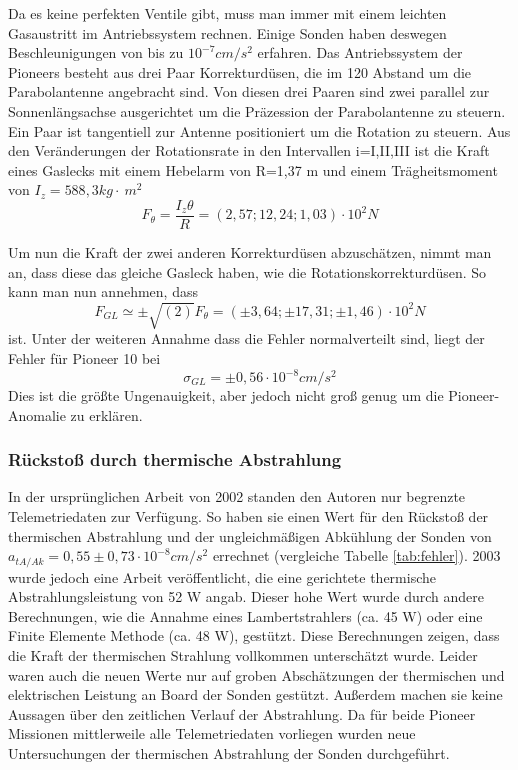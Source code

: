Da es keine perfekten Ventile gibt, muss man immer mit einem leichten
Gasaustritt im Antriebssystem rechnen. Einige Sonden\cite{Anderson2002} haben
deswegen Beschleunigungen von bis zu $10^{-7}\mathit{cm}/s^{2}$
erfahren. Das Antriebssystem der Pioneers besteht aus drei Paar
Korrekturd\"usen, die im 120{\textdegree} Abstand um die Parabolantenne
angebracht sind. Von diesen drei Paaren sind zwei parallel zur
Sonnenl\"angsachse ausgerichtet um die Pr\"azession der Parabolantenne
zu steuern. Ein Paar ist tangentiell zur Antenne positioniert um die
Rotation zu steuern. Aus den Ver\"anderungen der Rotationsrate in den
Intervallen i=I,II,III ist die Kraft eines Gaslecks mit einem Hebelarm
von R=1,37 m und einem Tr\"agheitsmoment von
$I_{z}=588,3\mathit{kg}\cdot\ m^{2}$
\begin{equation}
F_{\theta }=\frac{I_{z}\theta }{R}=(2,57;12,24;1,03)\cdot
10^{2}N
\end{equation}

Um nun die Kraft der zwei anderen Korrekturd\"usen abzusch\"atzen, nimmt
man an, dass diese das gleiche Gasleck haben, wie die
Rotationskorrekturd\"usen. So kann man nun annehmen\cite{Anderson2002}, dass
\begin{equation}
F_{\mathit{GL}}\simeq \pm \sqrt{(2)}F_{\theta }=(\pm 3,64;\pm
17,31;\pm 1,46)\cdot 10^{2}N
\end{equation}
ist. Unter der weiteren Annahme dass die Fehler normalverteilt sind,
liegt der Fehler f\"ur Pioneer 10 bei
\begin{equation}
\sigma _{\mathit{GL}}=\pm 0,56\cdot 10^{-8}\mathit{cm}/s^{2}
\end{equation}
Dies ist die gr\"o{\ss}te Ungenauigkeit, aber jedoch nicht gro{\ss}
genug um die Pioneer-Anomalie zu erkl\"aren.


\bigskip

\subsubsection{R\"ucksto{\ss} durch thermische Abstrahlung}\label{Hitze}

In der urspr\"unglichen Arbeit von 2002 \cite{Anderson2002} standen den Autoren nur
begrenzte Telemetriedaten zur Verf\"ugung. So haben sie einen Wert
f\"ur den R\"ucksto{\ss} der thermischen Abstrahlung und der
ungleichm\"a{\ss}igen Abk\"uhlung der Sonden von
$a_{\mathit{tA}/\mathit{Ak}}=0,55\pm 0,73\cdot
10^{-8}\mathit{cm}/s^{2}$ errechnet \cite{Anderson2002} (vergleiche Tabelle \ref{tab:fehler}). 2003 wurde jedoch
eine Arbeit ver\"offentlicht, die eine gerichtete thermische
Abstrahlungsleistung von 52 W angab. Dieser hohe Wert wurde durch
andere Berechnungen, wie die Annahme eines Lambertstrahlers (ca. 45 W)
oder eine Finite Elemente Methode (ca. 48 W), gest\"utzt\cite{Turyshev2010}. Diese Berechnungen zeigen, dass die Kraft der
thermischen Strahlung vollkommen untersch\"atzt wurde. Leider waren
auch die neuen Werte nur auf groben Absch\"atzungen der thermischen und
elektrischen Leistung an Board der Sonden gest\"utzt. Au{\ss}erdem
machen sie keine Aussagen \"uber den zeitlichen Verlauf der
Abstrahlung. Da f\"ur beide Pioneer Missionen mittlerweile alle
Telemetriedaten vorliegen wurden neue Untersuchungen der thermischen
Abstrahlung der Sonden durchgef\"uhrt.

